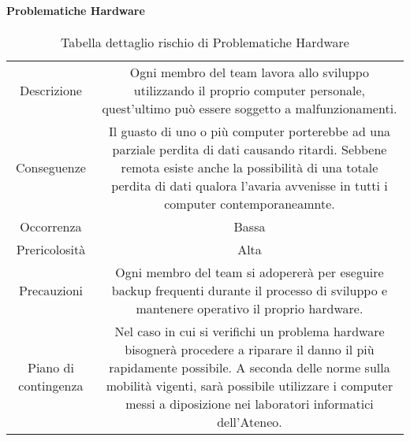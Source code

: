 \paragraph{Problematiche Hardware}
\renewcommand{\arraystretch}{1}
    \begin{table}[H]
        \begin{center}
            \setlength{\aboverulesep}{0pt}
            \setlength{\belowrulesep}{0pt}
            \setlength{\extrarowheight}{.75ex}
            \begin{tabular}{ c c }
                \rowcolor{AzzurroGruppo!30} 
                \toprule
                Descrizione & Ogni membro del team lavora allo sviluppo utilizzando il proprio computer personale, quest'ultimo può essere soggetto a malfunzionamenti. \\
                Conseguenze & Il guasto di uno o più computer porterebbe ad una parziale perdita di dati causando ritardi. Sebbene remota esiste anche la possibilità di una totale perdita di dati qualora l'avaria avvenisse in tutti i computer contemporaneamnte. \\
                Occorrenza & Bassa \\
                Prericolosità & Alta \\
                Precauzioni & Ogni membro del team si adopererà per eseguire backup frequenti durante il processo di sviluppo e mantenere operativo il proprio hardware. \\
                Piano di contingenza & Nel caso in cui si verifichi un problema hardware bisognerà procedere a riparare il danno il più rapidamente possibile. A seconda delle norme sulla mobilità vigenti, sarà possibile utilizzare i computer messi a diposizione nei laboratori informatici dell'Ateneo. \\
                \bottomrule
            \end{tabular}
            \caption{Tabella dettaglio rischio di Problematiche Hardware}
        \end{center}
    \end{table}

